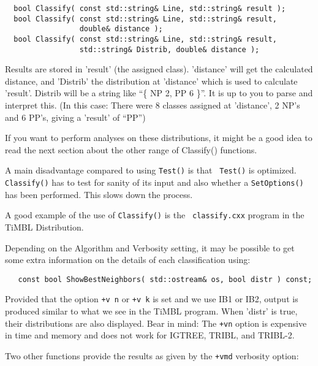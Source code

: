 \documentclass{report}
\begin{document}
\begin{footnotesize}
\begin{verbatim}
  bool Classify( const std::string& Line, std::string& result );
  bool Classify( const std::string& Line, std::string& result, 
                 double& distance );
  bool Classify( const std::string& Line, std::string& result,
                 std::string& Distrib, double& distance );
\end{verbatim}
\end{footnotesize}

Results are stored in 'result' (the assigned class). 'distance' will
get the calculated distance, and 'Distrib' the distribution at
'distance' which is used to calculate 'result'.  Distrib will be a
string like ``\{ NP 2, PP 6 \}''. It is up to you to parse and
interpret this. (In this case: There were 8 classes assigned at
'distance', 2 NP's and 6 PP's, giving a 'result' of ``PP'')

If you want to perform analyses on these distributions, it might be a
good idea to read the next section about the other range of Classify()
functions.

A main disadvantage compared to using {\tt Test()} is that {\tt
  Test()} is optimized.  {\tt Classify()} has to test for sanity of
its input and also whether a {\tt SetOptions()} has been
performed. This slows down the process.

A good example of the use of {\tt Classify()} is the {\tt
 classify.cxx} program in the TiMBL Distribution.

Depending on the Algorithm and Verbosity setting, it may be possible
to get some extra information on the details of each classification
using:

\begin{footnotesize}
\begin{verbatim}
   const bool ShowBestNeighbors( std::ostream& os, bool distr ) const;
\end{verbatim}
\end{footnotesize}

Provided that the option {\tt +v n} or {\tt +v k} is set and we use
IB1 or IB2, output is produced similar to what we see in the TiMBL
program.  When 'distr' is true, their distributions are also
displayed.  Bear in mind: The {\tt +vn} option is expensive in time
and memory and does not work for IGTREE, TRIBL, and TRIBL-2.

Two other functions provide the results as given by the {\tt +vmd} verbosity 
option:
\end{document}
